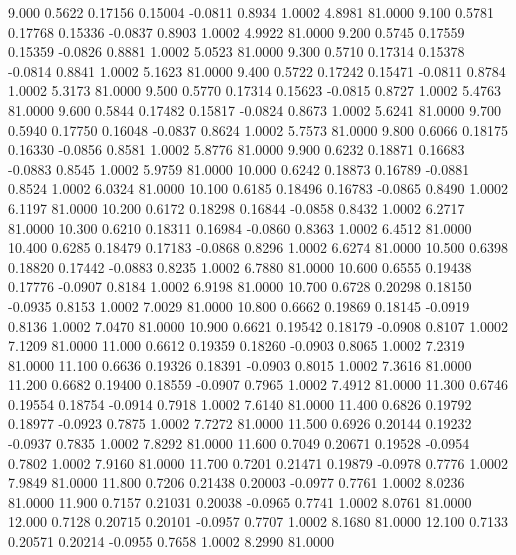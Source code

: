    9.000   0.5622   0.17156   0.15004  -0.0811   0.8934   1.0002   4.8981  81.0000
   9.100   0.5781   0.17768   0.15336  -0.0837   0.8903   1.0002   4.9922  81.0000
   9.200   0.5745   0.17559   0.15359  -0.0826   0.8881   1.0002   5.0523  81.0000
   9.300   0.5710   0.17314   0.15378  -0.0814   0.8841   1.0002   5.1623  81.0000
   9.400   0.5722   0.17242   0.15471  -0.0811   0.8784   1.0002   5.3173  81.0000
   9.500   0.5770   0.17314   0.15623  -0.0815   0.8727   1.0002   5.4763  81.0000
   9.600   0.5844   0.17482   0.15817  -0.0824   0.8673   1.0002   5.6241  81.0000
   9.700   0.5940   0.17750   0.16048  -0.0837   0.8624   1.0002   5.7573  81.0000
   9.800   0.6066   0.18175   0.16330  -0.0856   0.8581   1.0002   5.8776  81.0000
   9.900   0.6232   0.18871   0.16683  -0.0883   0.8545   1.0002   5.9759  81.0000
  10.000   0.6242   0.18873   0.16789  -0.0881   0.8524   1.0002   6.0324  81.0000
  10.100   0.6185   0.18496   0.16783  -0.0865   0.8490   1.0002   6.1197  81.0000
  10.200   0.6172   0.18298   0.16844  -0.0858   0.8432   1.0002   6.2717  81.0000
  10.300   0.6210   0.18311   0.16984  -0.0860   0.8363   1.0002   6.4512  81.0000
  10.400   0.6285   0.18479   0.17183  -0.0868   0.8296   1.0002   6.6274  81.0000
  10.500   0.6398   0.18820   0.17442  -0.0883   0.8235   1.0002   6.7880  81.0000
  10.600   0.6555   0.19438   0.17776  -0.0907   0.8184   1.0002   6.9198  81.0000
  10.700   0.6728   0.20298   0.18150  -0.0935   0.8153   1.0002   7.0029  81.0000
  10.800   0.6662   0.19869   0.18145  -0.0919   0.8136   1.0002   7.0470  81.0000
  10.900   0.6621   0.19542   0.18179  -0.0908   0.8107   1.0002   7.1209  81.0000
  11.000   0.6612   0.19359   0.18260  -0.0903   0.8065   1.0002   7.2319  81.0000
  11.100   0.6636   0.19326   0.18391  -0.0903   0.8015   1.0002   7.3616  81.0000
  11.200   0.6682   0.19400   0.18559  -0.0907   0.7965   1.0002   7.4912  81.0000
  11.300   0.6746   0.19554   0.18754  -0.0914   0.7918   1.0002   7.6140  81.0000
  11.400   0.6826   0.19792   0.18977  -0.0923   0.7875   1.0002   7.7272  81.0000
  11.500   0.6926   0.20144   0.19232  -0.0937   0.7835   1.0002   7.8292  81.0000
  11.600   0.7049   0.20671   0.19528  -0.0954   0.7802   1.0002   7.9160  81.0000
  11.700   0.7201   0.21471   0.19879  -0.0978   0.7776   1.0002   7.9849  81.0000
  11.800   0.7206   0.21438   0.20003  -0.0977   0.7761   1.0002   8.0236  81.0000
  11.900   0.7157   0.21031   0.20038  -0.0965   0.7741   1.0002   8.0761  81.0000
  12.000   0.7128   0.20715   0.20101  -0.0957   0.7707   1.0002   8.1680  81.0000
  12.100   0.7133   0.20571   0.20214  -0.0955   0.7658   1.0002   8.2990  81.0000
